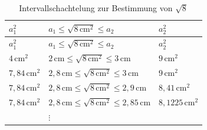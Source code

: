 \documentclass[
]{scrbook}
\theoremstyle{definition}
\theoremstyle{definition}
\theoremstyle{definition}
\theoremstyle{definition}
\theoremstyle{remark}
\begin{document}
\begin{enumerate}
  \begin{longtable}[]{@{}
    >{\centering\arraybackslash}p{}
    >{\centering\arraybackslash}p{}
    >{\centering\arraybackslash}p{}@{}}
  \caption{\label{tab:intervallschachtelung} Intervallschachtelung zur Bestimmung von \(\sqrt{8}\)}\tabularnewline
  \toprule\noalign{}
  \begin{minipage}[b]{\linewidth}\centering
  \(a_1^2\)
  \end{minipage} & \begin{minipage}[b]{\linewidth}\centering
  \(a_1 \leq \sqrt{8\,\mathrm{cm}^2} \leq a_2\)
  \end{minipage} & \begin{minipage}[b]{\linewidth}\centering
  \(a_2^2\)
  \end{minipage} \\
  \midrule\noalign{}
  \endfirsthead
  \toprule\noalign{}
  \begin{minipage}[b]{\linewidth}\centering
  \(a_1^2\)
  \end{minipage} & \begin{minipage}[b]{\linewidth}\centering
  \(a_1 \leq \sqrt{8\,\mathrm{cm}^2} \leq a_2\)
  \end{minipage} & \begin{minipage}[b]{\linewidth}\centering
  \(a_2^2\)
  \end{minipage} \\
  \midrule\noalign{}
  \endhead
  \bottomrule\noalign{}
  \endlastfoot
  \(4\,\mathrm{cm}^2\) & \(2\,\mathrm{cm} \leq \sqrt{8\,\mathrm{cm}^2}\leq 3\,\mathrm{cm}\) & \(9\,\mathrm{cm}^2\) \\
  \(7{,}84\,\mathrm{cm}^2\) & \(2{,}8\,\mathrm{cm} \leq \sqrt{8\,\mathrm{cm}^2}\leq 3\,\mathrm{cm}\) & \(9\,\mathrm{cm}^2\) \\
  \(7{,}84\,\mathrm{cm}^2\) & \(2{,}8\,\mathrm{cm} \leq \sqrt{8\,\mathrm{cm}^2}\leq 2{,}9\,\mathrm{cm}\) & \(8{,}41\,\mathrm{cm}^2\) \\
  \(7{,}84\,\mathrm{cm}^2\) & \(2{,}8\,\mathrm{cm} \leq \sqrt{8\,\mathrm{cm}^2}\leq 2{,}85\,\mathrm{cm}\) & \(8{,}1225\,\mathrm{cm}^2\) \\
  & \(\vdots\) & \\
  \end{longtable}


\end{enumerate}
\end{document}
